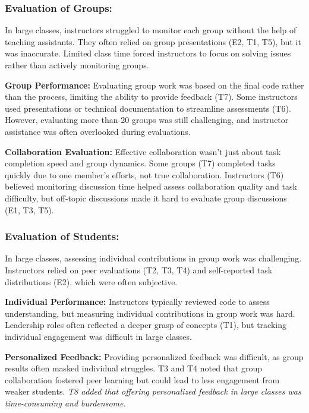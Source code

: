 \subsubsection{Evaluation of Groups:}
In large classes, instructors struggled to monitor each group without the help of teaching assistants. They often relied on group presentations (E2, T1, T5), but it was inaccurate. Limited class time forced instructors to focus on solving issues rather than actively monitoring groups.


\textbf{Group Performance:}
Evaluating group work was based on the final code rather than the process, limiting the ability to provide feedback (T7). Some instructors used presentations or technical documentation to streamline assessments (T6). However, evaluating more than 20 groups was still challenging, and instructor assistance was often overlooked during evaluations.


\textbf{Collaboration Evaluation:}
Effective collaboration wasn't just about task completion speed and group dynamics. Some groups (T7) completed tasks quickly due to one member's efforts, not true collaboration. 
 Instructors (T6) believed monitoring discussion time helped assess collaboration quality and task difficulty, but off-topic discussions made it hard to evaluate group discussions (E1, T3, T5).


\subsubsection{Evaluation of Students:}

In large classes, assessing individual contributions in group work was challenging. Instructors relied on peer evaluations (T2, T3, T4) and self-reported task distributions (E2), which were often subjective.

\textbf{Individual Performance:}
Instructors typically reviewed code to assess understanding, but measuring individual contributions in group work was hard. Leadership roles often reflected a deeper grasp of concepts (T1), but tracking individual engagement was difficult in large classes.


\textbf{Personalized Feedback:}
Providing personalized feedback was difficult, as group results often masked individual struggles. T3 and T4 noted that group collaboration fostered peer learning but could lead to less engagement from weaker students.
\textit{T8 added that offering personalized feedback in large classes was time-consuming and burdensome.}

